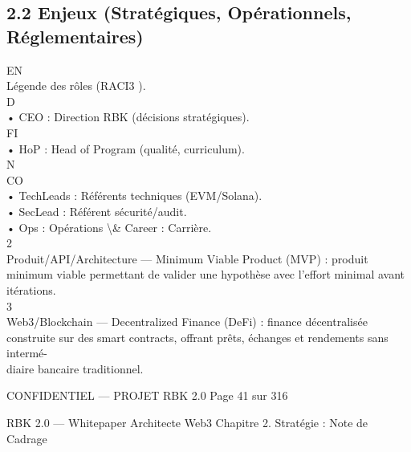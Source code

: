 \documentclass[12pt,landscape,a4paper]{article}
\newenvironment{confidential}
{\begin{tcolorbox}[
    colback=rbkred!5!white,
    colframe=rbkred!75!black,
    title=CONFIDENTIEL,
    fonttitle=\bfseries\color{white},
    coltitle=rbkred!75!black,
    breakable,
    enhanced,
    frame hidden,
    borderline west={2pt}{0pt}{rbkred!75!black}
]}
{\end{tcolorbox}}
\begin{document}
\subsection{2.2 Enjeux (Stratégiques, Opérationnels, Réglementaires)}
\vspace{0.5em}
\vspace{0.5em}
\vspace{0.5em}
\vspace{0.5em}
EN\\
Légende des rôles (RACI3 ).\\
\vspace{0.5em}
\vspace{0.5em}
\vspace{0.5em}
\vspace{0.5em}
D\\
• CEO : Direction RBK (décisions stratégiques).\\
\vspace{0.5em}
\vspace{0.5em}
\vspace{0.5em}
\vspace{0.5em}
FI\\
• HoP : Head of Program (qualité, curriculum).\\
N\\
CO\\
• TechLeads : Référents techniques (EVM/Solana).\\
\vspace{0.5em}
• SecLead : Référent sécurité/audit.\\
\vspace{0.5em}
• Ops : Opérations \textbackslash{}& Career : Carrière.\\
2\\
Produit/API/Architecture — Minimum Viable Product (MVP) : produit minimum viable permettant de valider une hypothèse avec l’effort minimal avant itérations.\\
3\\
Web3/Blockchain — Decentralized Finance (DeFi) : finance décentralisée construite sur des smart contracts, offrant prêts, échanges et rendements sans intermé-\\
diaire bancaire traditionnel.\\
\vspace{0.5em}
\vspace{0.5em}
\vspace{0.5em}
\vspace{0.5em}
\begin{confidential}CONFIDENTIEL — PROJET RBK 2.0                                           Page 41 sur 316\end{confidential}
RBK 2.0 — Whitepaper Architecte Web3                                                                 Chapitre 2. Stratégie : Note de Cadrage\\
\vspace{0.5em}
\vspace{0.5em}
\vspace{0.5em}
\end{document}
